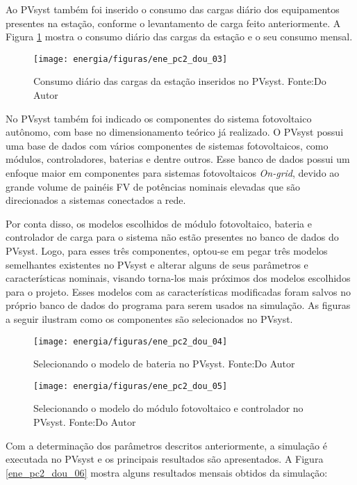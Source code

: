 	Ao PVsyst também foi inserido o consumo das cargas diário dos equipamentos presentes na estação, conforme o levantamento de carga feito anteriormente. A Figura \ref{ene_pc2_dou_03} mostra o consumo diário das cargas da estação e o seu consumo mensal.
	
\begin{figure}[H]
		\centering
		\texttt{[image: energia/figuras/ene\_pc2\_dou\_03]}
		\caption{Consumo diário das cargas da estação inseridos no PVsyst. Fonte:Do Autor}
		\label{ene_pc2_dou_03}
\end{figure}

No PVsyst também foi indicado os componentes do sistema fotovoltaico autônomo, com base no dimensionamento teórico já realizado. O PVsyst possui uma base de dados com vários componentes de sistemas fotovoltaicos, como módulos, controladores, baterias e dentre outros. Esse banco de dados possui um enfoque maior em componentes para sistemas fotovoltaicos \textit{On-grid}, devido ao grande volume de painéis FV de potências nominais elevadas que são direcionados a sistemas conectados a rede. 

Por conta disso, os modelos escolhidos de módulo fotovoltaico, bateria e controlador de carga para o sistema não estão presentes no banco de dados do PVsyst. Logo, para esses três componentes, optou-se em pegar três modelos semelhantes existentes no PVsyst e alterar alguns de seus parâmetros e características nominais, visando torna-los mais próximos dos modelos escolhidos para o projeto. Esses modelos com as características modificadas foram salvos no próprio banco de dados do programa para serem usados na simulação. As figuras a seguir ilustram como os componentes são selecionados no PVsyst.

\begin{figure}[H]
		\centering
		\texttt{[image: energia/figuras/ene\_pc2\_dou\_04]}
		\caption{Selecionando o modelo de bateria no PVsyst. Fonte:Do Autor}
		\label{ene_pc2_dou_04}
\end{figure}

\begin{figure}[H]
		\centering
		\texttt{[image: energia/figuras/ene\_pc2\_dou\_05]}
		\caption{Selecionando o modelo do módulo fotovoltaico e controlador no PVsyst. Fonte:Do Autor}
		\label{ene_pc2_dou_05}
\end{figure}

Com a determinação dos parâmetros descritos anteriormente, a simulação é executada no PVsyst e os principais resultados são apresentados. A Figura \ref{ene_pc2_dou_06} mostra alguns resultados mensais obtidos da simulação:

